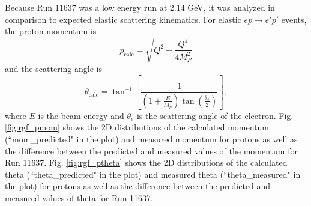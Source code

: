 Because Run 11637 was a low energy run at 2.14 GeV, it was analyzed in comparison to expected elastic scattering kinematics. For elastic $ep\rightarrow e'p'$ events, the proton momentum is
\begin{equation}
p_{\mathrm{calc}} = \sqrt{Q^2+\frac{Q^4}{4M_P^2}}
\end{equation}
and the scattering angle is
\begin{equation}
\theta_{\mathrm{calc}} = \tan^{-1} \left[ \frac{1}{ \left( 1+\frac{E}{M_p} \right) \tan \left( \frac{\theta_e}{2} \right) } \right],
\end{equation}
where $E$ is the beam energy and $\theta_e$ is the scattering angle of the electron. Fig. \ref{fig:rgf_pmom} shows the 2D distributions of the calculated momentum (``mom\_predicted" in the plot) and measured momentum for protons as well as the difference between the predicted and measured values of the momentum for Run 11637. Fig. \ref{fig:rgf_ptheta} shows the 2D distributions of the calculated theta (``theta\_predicted" in the plot) and measured theta (``theta\_measured" in the plot) for protons as well as the difference between the predicted and measured values of theta for Run 11637. 

